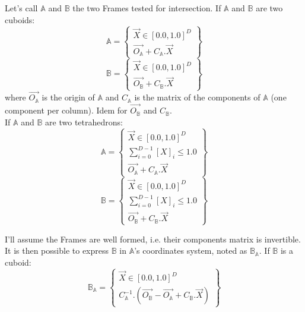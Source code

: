 \documentclass[12pt, a4paper]{article}
\begin{document}
Let's call $\mathbb{A}$ and $\mathbb{B}$ the two Frames tested for intersection. If $\mathbb{A}$ and $\mathbb{B}$ are two cuboids:
\begin{equation}
\mathbb{A}=\left\lbrace
\begin{array}{c}
\overrightarrow{X}\in[0.0,1.0]^D\\
\overrightarrow{O_\mathbb{A}}+C_\mathbb{A}.\overrightarrow{X}
\end{array}
\right\rbrace
\end{equation}
\begin{equation}
\mathbb{B}=\left\lbrace
\begin{array}{c}
\overrightarrow{X}\in[0.0,1.0]^D\\
\overrightarrow{O_\mathbb{B}}+C_\mathbb{B}.\overrightarrow{X}
\end{array}
\right\rbrace
\end{equation}
where $\overrightarrow{O_\mathbb{A}}$ is the origin of $\mathbb{A}$ and $C_\mathbb{A}$ is the matrix of the components of $\mathbb{A}$ (one component per column). Idem for $\overrightarrow{O_\mathbb{B}}$ and $C_\mathbb{B}$.\\

If $\mathbb{A}$ and $\mathbb{B}$ are two tetrahedrons:
\begin{equation}
\mathbb{A}=\left\lbrace
\begin{array}{c}
\overrightarrow{X}\in[0.0,1.0]^D\\
\sum_{i=0}^{D-1}\left[X\right]_i\le1.0\\
\overrightarrow{O_\mathbb{A}}+C_\mathbb{A}.\overrightarrow{X}
\end{array}
\right\rbrace
\end{equation}
\begin{equation}
\mathbb{B}=\left\lbrace
\begin{array}{c}
\overrightarrow{X}\in[0.0,1.0]^D\\
\sum_{i=0}^{D-1}\left[X\right]_i\le1.0\\
\overrightarrow{O_\mathbb{B}}+C_\mathbb{B}.\overrightarrow{X}
\end{array}
\right\rbrace
\end{equation}

I'll assume the Frames are well formed, i.e. their components matrix is invertible. It is then possible to express $\mathbb{B}$ in $\mathbb{A}$'s coordinates system, noted as $\mathbb{B}_\mathbb{A}$. If $\mathbb{B}$ is a cuboid:
\begin{equation}
\mathbb{B}_\mathbb{A}=\left\lbrace
\begin{array}{c}
\overrightarrow{X}\in[0.0,1.0]^D\\
C_\mathbb{A}^{-1}.(\overrightarrow{O_\mathbb{B}}-\overrightarrow{O_\mathbb{A}}+C_\mathbb{B}.\overrightarrow{X})
\end{array}
\right\rbrace
\end{equation}
\end{document}
